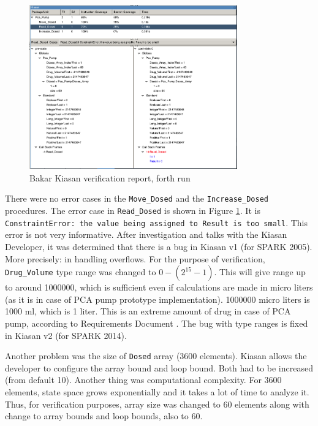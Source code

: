 \begin{figure}[ht]%
    \begin{center}
        \includegraphics[width=0.8\textwidth]{figures/pca-pump-verification-step4.png}
    \end{center}
    \caption{Bakar Kiasan verification report, forth run}
    \label{figure:sparkverification:kiasanreport4}
\end{figure}

There were no error cases in the \lstinline{Move_Dosed} and the \lstinline{Increase_Dosed} procedures. The error case in \lstinline{Read_Dosed} is shown in Figure \ref{figure:sparkverification:kiasanreport4}. It is \lstinline{ConstraintError: the value being assigned to Result is too small}. This error is not very informative. After investigation and talks with the Kiasan Developer, it was determined that there is a bug in Kiasan v1 (for SPARK 2005). More precisely: in handling overflows. For the purpose of verification, \lstinline{Drug_Volume} type range was changed to $0 - (2^{15} - 1)$. This will give range up to around 1000000, which is sufficient even if calculations are made in micro liters (as it is in case of PCA pump prototype implementation). 1000000 micro liters is 1000 ml, which is 1 liter. This is an extreme amount of drug in case of PCA pump, according to Requirements Document \cite{PcaReq}. The bug with type ranges is fixed in Kiasan v2 (for SPARK 2014).

Another problem was the size of \lstinline{Dosed} array (3600 elements). Kiasan allows the developer to configure the array bound and loop bound. Both had to be increased (from default 10). Another thing was computational complexity. For 3600 elements, state space grows exponentially and it takes a lot of time to analyze it. Thus, for verification purposes, array size was changed to 60 elements along with change to array bounds and loop bounds, also to 60.

